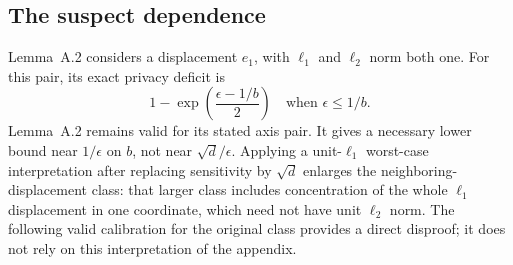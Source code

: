 \documentclass[10pt]{article}
\begin{document}
\subsection*{The suspect dependence}
Lemma A.2 considers a displacement \(e_1\), with \(\ell_1\) and \(\ell_2\) norm both one. For this pair, its exact privacy deficit is \[1-\exp\!\left(\frac{\epsilon-1/b}{2}\right)
 \quad\text{when }\epsilon\leq1/b.\] Lemma A.2 remains valid for its stated axis pair. It gives a necessary lower bound near \(1/\epsilon\) on \(b\), not near \(\sqrt d/\epsilon\). Applying a unit-\(\ell_1\) worst-case interpretation after replacing sensitivity by \(\sqrt d\) enlarges the neighboring-displacement class: that larger class includes concentration of the whole \(\ell_1\) displacement in one coordinate, which need not have unit \(\ell_2\) norm. The following valid calibration for the original class provides a direct disproof; it does not rely on this interpretation of the appendix.\par
\end{document}
